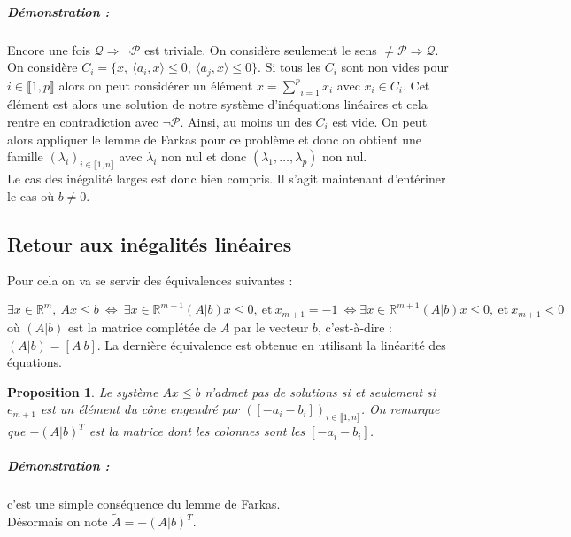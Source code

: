 \documentclass[10pt,a4paper]{article}
\newtheorem{thm}{Théorème}
\newtheorem{prop}{Proposition}
\begin{document}
\subparagraph{Démonstration :}
  Encore une fois $\mathcal{Q} \Rightarrow \neg \mathcal{P}$ est triviale.
  On considère seulement le sens $\neq \mathcal{P} \Rightarrow \mathcal{Q}$.
  On considère $C_i=\lbrace
  x, \ \langle a_i,x \rangle \le 0, \ \langle a_j,x \rangle \le 0\rbrace$.
  Si tous les $C_i$ sont non vides pour $i \in \llbracket 1,p \rrbracket$ alors on peut considérer un élément $x=\underset{i=1}{\overset{p}{\sum}}x_i$ avec $x_i \in C_i$.
  Cet élément est alors une solution de notre système d'inéquations linéaires et cela rentre en contradiction avec $\neg \mathcal{P}$.
  Ainsi, au moins un des $C_i$ est vide.
  On peut alors appliquer le lemme de Farkas pour ce problème et donc on obtient une famille $(\lambda_i)_{i \in \llbracket 1,n \rrbracket}$ avec $\lambda_i$ non nul et donc $(\lambda_1, \dots, \lambda_p)$ non nul.
  \\


Le cas des inégalité larges est donc bien compris.
Il s'agit maintenant d'entériner le cas où $b \neq 0$.

\subsection{Retour aux inégalités linéaires}

Pour cela on va se servir des équivalences suivantes :

\begin{equation}
\exists x \in \mathbb{R}^m, \ Ax \le b \ \Leftrightarrow \ \exists x \in \mathbb{R}^{m+1}(A\vert b)x\le 0, \ \text{et} \ x_{m+1}=-1 \ \Leftrightarrow \exists x \in \mathbb{R}^{m+1}(A\vert b)x\le 0, \ \text{et} \ x_{m+1}<0
\end{equation}
où $(A \vert b)$ est la matrice complétée de $A$ par le vecteur $b$, c'est-à-dire : $(A\vert b)= [A \ b ]$.
La dernière équivalence est obtenue en utilisant la linéarité des équations.

\begin{prop}
Le système $Ax \le b$ n'admet pas de solutions si et seulement si $e_{m+1}$ est un élément du cône engendré par  $([-a_i -b_i])_{i \in \llbracket 1,n \rrbracket}$.
On remarque que $-(A \vert b)^T$ est la matrice dont les colonnes sont les $[-a_i -b_i]$.
\end{prop}
\subparagraph{Démonstration :} c'est une simple conséquence du lemme de Farkas.\\
Désormais on note $\tilde{A}=-(A \vert b)^T$.
\end{document}
